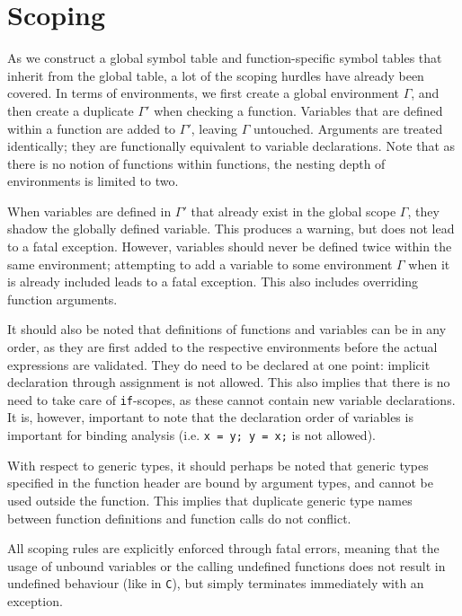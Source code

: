 \documentclass[a4paper]{article}
\begin{document}
\section{Scoping}

As we construct a global symbol table and function-specific symbol tables that inherit from the global table, a lot of the scoping hurdles have already been covered. In terms of environments, we first create a global environment $\Gamma$, and then create a duplicate $\Gamma'$ when checking a function. Variables that are defined within a function are added to $\Gamma'$, leaving $\Gamma$ untouched. Arguments are treated identically; they are functionally equivalent to variable declarations. Note that as there is no notion of functions within functions, the nesting depth of environments is limited to two.

When variables are defined in $\Gamma'$ that already exist in the global scope $\Gamma$, they shadow the globally defined variable. This produces a warning, but does not lead to a fatal exception. However, variables should never be defined twice within the same environment; attempting to add a variable to some environment $\Gamma$ when it is already included leads to a fatal exception. This also includes overriding function arguments.

It should also be noted that definitions of functions and variables can be in any order, as they are first added to the respective environments before the actual expressions are validated. They do need to be declared at one point: implicit declaration through assignment is not allowed. This also implies that there is no need to take care of {\tt if}-scopes, as these cannot contain new variable declarations. It is, however, important to note that the declaration order of variables is important for binding analysis (i.e. {\tt x = y; y = x;} is not allowed).

With respect to generic types, it should perhaps be noted that generic types specified in the function header are bound by argument types, and cannot be used outside the function. This implies that duplicate generic type names between function definitions and function calls do not conflict.

All scoping rules are explicitly enforced through fatal errors, meaning that the usage of unbound variables or the calling undefined functions does not result in undefined behaviour (like in {\tt C}), but simply terminates immediately with an exception.
\end{document}
